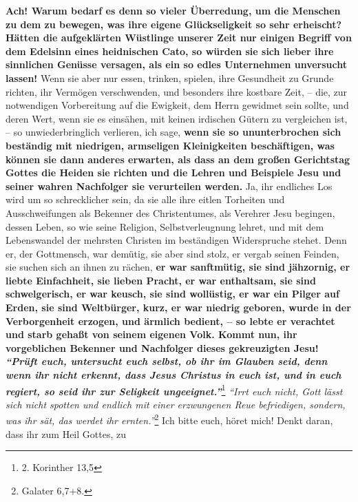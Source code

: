 \medskip

\label{ref:18_11_ueberredung}
\textbf{Ach! Warum bedarf es denn so vieler Überredung, um die Menschen zu dem
zu
bewegen, was ihre eigene Glückseligkeit so sehr erheischt? Hätten die
aufgeklärten Wüstlinge unserer Zeit nur einigen Begriff von dem Edelsinn eines
heidnischen Cato, so würden sie sich lieber ihre
sinnlichen Genüsse
versagen, als ein so edles Unternehmen unversucht lassen!} Wenn sie aber nur
essen, trinken, spielen, ihre Gesundheit zu Grunde richten, ihr Vermögen
verschwenden, und besonders ihre kostbare Zeit, -- die, zur notwendigen
Vorbereitung auf die Ewigkeit, dem Herrn gewidmet sein sollte, und deren Wert,
wenn sie es einsähen, mit keinen irdischen Gütern zu vergleichen ist, -- so
unwiederbringlich verlieren, ich sage, \textbf{wenn sie so ununterbrochen sich
beständig mit niedrigen, armseligen Kleinigkeiten beschäftigen, was können sie
dann anderes erwarten, als dass an dem großen Gerichtstag Gottes die
Heiden sie
richten und die Lehren und Beispiele Jesu und seiner wahren Nachfolger sie
verurteilen werden.} Ja, ihr endliches Los wird um so schrecklicher sein, da
sie alle ihre eitlen Torheiten und Ausschweifungen als Bekenner des
Christentumes, als Verehrer Jesu begingen, dessen Leben, so wie seine
Religion, Selbstverleugnung lehret, und mit dem Lebenswandel der mehrsten
Christen im beständigen Widerspruche stehet. Denn er, der
Gottmensch, war
demütig, sie aber sind stolz, er vergab seinen Feinden, sie suchen sich an
ihnen zu rächen, \textbf{er war sanftmütig, sie sind jähzornig, er liebte
Einfachheit,
sie lieben Pracht, er war enthaltsam, sie sind schwelgerisch, er war keusch, sie
sind wollüstig, er war ein Pilger auf Erden, sie sind Weltbürger, kurz, er war
niedrig geboren, wurde in der Verborgenheit erzogen, und ärmlich bedient, -- so
lebte er verachtet und starb gehaßt von seinem eigenen Volk. Kommt nun, ihr
vorgeblichen Bekenner und Nachfolger dieses gekreuzigten Jesu!
\textit{"`Prüft euch,
untersucht euch selbst, ob ihr im Glauben seid, denn wenn ihr nicht erkennt,
dass Jesus Christus in euch ist, und in euch regiert, so seid ihr zur
Seligkeit ungeeignet."'}}\footnote{2. Korinther 13,5}
\textit{"`Irrt euch
nicht, Gott lässt sich nicht spotten und endlich mit einer erzwungenen Reue
befriedigen, sondern, was ihr sät, das werdet ihr ernten."'}\footnote{Galater
6,7+8.}
Ich bitte euch, höret mich! Denkt daran, dass ihr zum Heil Gottes, zu

